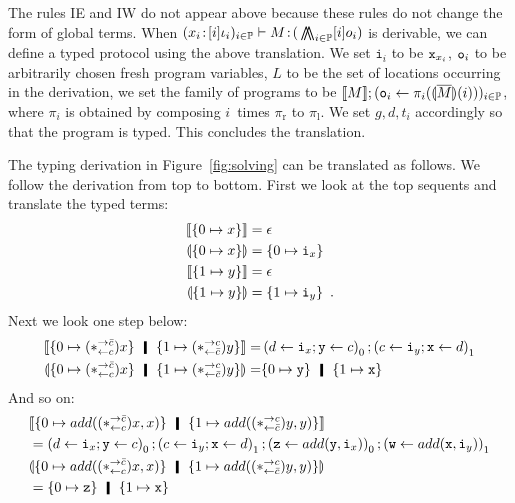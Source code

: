 The rules IE and IW do not appear above because these rules do not
change the form of global terms.
When $({x_i} \mathord{\colon\kern -2pt}{[i]\iota_i})_{i\in\mathbb{P}}
\vdash{M} \mathord{\colon\kern -2pt}{(}\operatorname*{\bigwedge\kern -8pt \bigwedge}_{i\in \mathbb{P}}[i]o_i)$ is
derivable,
we can define a typed protocol using the above translation.
We set $\mathtt i_i$ to be ${\texttt{x}}_{x_i}$, ${\texttt{o}}_i$ to be arbitrarily
chosen fresh program variables, $L$ to be the set of locations
occurring in the derivation, we set the family of programs to be
$\llbracket{M}\rrbracket; ({\texttt{o}}_i\leftarrow \pi_i(\llparenthesis{\overline M}\rrparenthesis(i)))_{i\in\mathbb{P}}$,
where $\pi_i$ is obtained by composing $i$~times $\pi_{\mathrm r}$ to
$\pi_{\mathrm l}$.
We set $g,d,t_i$ accordingly so that the program is typed.
This concludes the translation.
 \begin{example}
  The typing derivation in Figure~\ref{fig:solving} can be translated
  as follows.  We follow the derivation from top to bottom.  First we
  look at the top sequents and translate the typed terms:
  \begin{align*}
   \llbracket{{\{0\mapsto x\}}}\rrbracket&= \epsilon\\
   \llparenthesis{{\{0\mapsto x\}}}\rrparenthesis &=
   \{0\mapsto \texttt{i}_x\} \\
   \llbracket{{\{1\mapsto y\}}}\rrbracket &=
   \epsilon\\
   \llparenthesis{{\{1\mapsto y\}}}\rrparenthesis &=
   \{1\mapsto \texttt{i}_y\}\enspace.
  \end{align*}
  Next we look one step below:
  \begin{align*}
   \semo{{\{0\mapsto (\comodL)x\}} \hmid
   {\{1\mapsto (\comodR)y\}}}
   =&
   \left(d\leftarrow\p i_x; \p y \leftarrow c\right)_0;
   \left(c\leftarrow\p i_y; \p x \leftarrow d\right)_1\\
   \semoi{{\{0\mapsto (\comodL)x\}} \hmid
   {\{1\mapsto (\comodR)y\}}}
   =& \{0\mapsto \p y\}\hmid \{1\mapsto \p x\}\enspace
  \end{align*}
  And so on:
\begin{align*}
 &\semo{{\{0\mapsto add((\comodL)x,x)\}}\hmid
  {\{1\mapsto add((\comodR)y,y)\}}}\\
&= \left(d\leftarrow \p i_x; \p y\leftarrow c\right)_0;
 \left(c\leftarrow \p i_y; \p x\leftarrow d\right)_1;
 \left(\p z\leftarrow add(\p y,\p i_x)\right)_0;
 \left(\p w\leftarrow add(\p x,\p i_y)\right)_1
 \\
 &\semoi{{\{0\mapsto add((\comodL)x,x)\}}\hmid
  \{1\mapsto add((\comodR)y,y)\}} \\
 &= \{0\mapsto \p z\} \hmid \{1\mapsto \p x\}
\end{align*}

\end{example}
